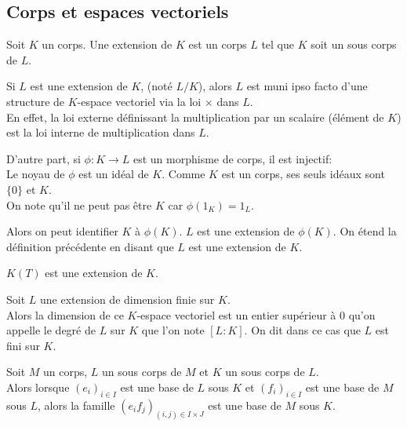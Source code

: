 \subsection{Corps et espaces vectoriels}


\begin{definition}
	Soit $K$ un corps. Une extension de $K$ est un corps $L$ tel que $K$ soit un sous corps de $L$.
\end{definition}


\begin{remarque}
	Si $L$ est une extension de $K$, (noté $L/K$), alors $L$ est muni ipso facto d'une structure de $K$-espace vectoriel via la loi $\times$ dans $L$.\\
	En effet, la loi externe définissant la multiplication par un scalaire (élément de $K$) est la loi interne de multiplication dans $L$.

	D'autre part, si $\phi : K \to L$ est un morphisme de corps, il est injectif: \\
	Le noyau de $\phi$ est un idéal de $K$. Comme $K$ est un corps, ses seuls idéaux sont $\{0\}$ et $K$.\\
	On note qu'il ne peut pas être $K$ car $\phi(1_K) = 1_L$.

	Alors on peut identifier $K$ à $\phi(K)$. $L$ est une extension de $\phi(K)$. On étend la définition précédente en disant que $L$ est une extension de $K$.
\end{remarque}

\begin{example}
	$K(T)$ est une extension de $K$.
\end{example}

\begin{definition}
	Soit $L$ une extension de dimension finie sur $K$.\\
	Alors la dimension de ce $K$-espace vectoriel est un entier supérieur à 0 qu'on appelle
	le degré de $L$ sur $K$ que l'on note $[L : K]$. On dit dans ce cas que $L$ est fini sur $K$.
\end{definition}

\begin{theorem}
	Soit $M$ un corps, $L$ un sous corps de $M$ et $K$ un sous corps de $L$.\\
	Alors lorsque $(e_i)_{i\in I}$ est une base de $L$ sous $K$ et $(f_i)_{i\in I}$ est une base de $M$ sous $L$, alors la famille
	$(e_if_j)_{(i,j)\in I\times J}$ est une base de $M$ sous $K$.
\end{theorem}


